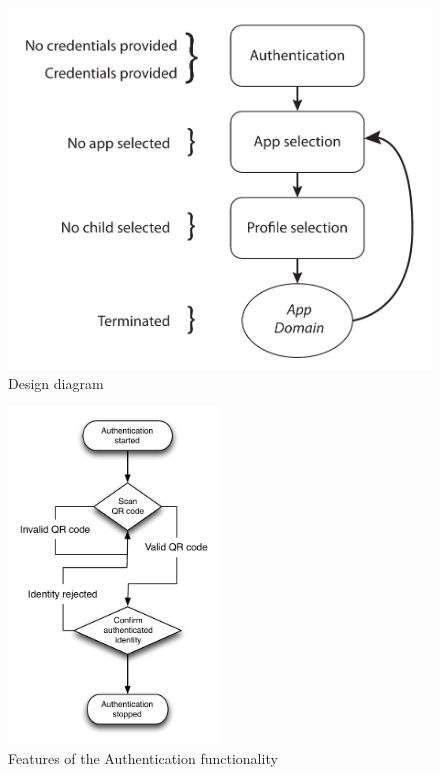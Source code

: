 \begin{figure}[h]
	\centering
	\includegraphics[width=1\textwidth]{gfx/design_diagram.pdf}
	\caption{Design diagram}
	\label{fig:design_diagram}
\end{figure}

\begin{figure}[h]
	\centering
	\includegraphics[width=0.5\textwidth]{gfx/authentication_design.pdf}
	\caption{Features of the Authentication functionality}
	\label{fig:authentication_design}
\end{figure}

